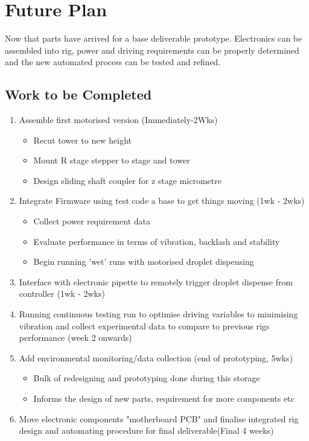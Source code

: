 \chapter{Future Plan}\label{C:fut} 
Now that parts have arrived for a base deliverable prototype. Electronics can be assembled into rig, power and driving requirements can be properly determined and the new automated process can be tested and refined.

\section{Work to be Completed}
\begin{enumerate}
    \item Assemble first motorised version (Immediately-2Wks)
    \begin{itemize}
        \item Recut tower to new height
        \item Mount R stage stepper to stage and tower 
        \item Design sliding shaft coupler for z stage micrometre
    \end{itemize}
    \item Integrate Firmware using test code a base to get things moving (1wk - 2wks)
    \begin{itemize}
        \item Collect power requirement data
        \item Evaluate performance in terms of vibration, backlash and stability
        \item Begin running 'wet' runs with motorised droplet dispensing
    \end{itemize}
    \item Interface with electronic pipette to remotely trigger droplet dispense from controller (1wk - 2wks)
    \item Running continuous testing run to optimise driving variables to minimising vibration and collect experimental data to compare to previous rigs performance (week 2 onwards)
    \item Add environmental monitoring/data collection (end of prototyping, 5wks)
    \begin{itemize}
        \item Bulk of redesigning and prototyping done during this storage
        \item Informs the design of new parts, requirement for more components etc
    \end{itemize}
    \item Move electronic components "motherboard PCB" and finalise integrated rig design and automating procedure for final deliverable(Final 4 weeks)
\end{enumerate}